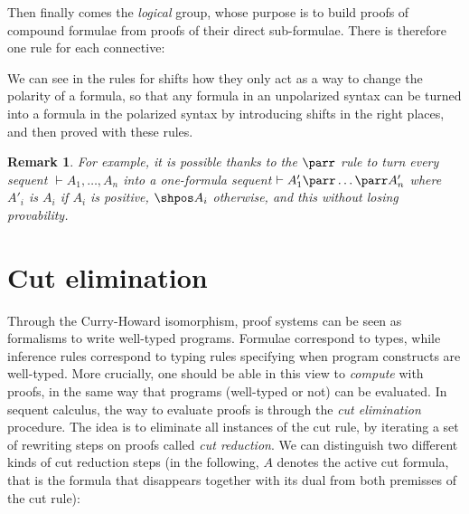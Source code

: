 \documentclass[12pt]{report}
\newcommand{\seq}{\vdash}
\newcommand{\irule}[1]{\vspace*{-10em}\footnotesize$#1$}
\newtheorem{remark}{Remark}
\begin{document}
Then finally comes the \emph{logical} group, whose purpose is to build proofs of compound formulae
from proofs of their direct sub-formulae. There is therefore one rule for each connective:


We can see in the rules for shifts how they only act as a way to change the polarity of a formula,
so that any formula in an unpolarized syntax can be turned into a formula in the polarized syntax by
introducing shifts in the right places, and then proved with these rules.

\begin{remark}\label{rem:parr-shifts}
For example, it is possible thanks to the $\parr$ rule to turn every sequent $\seq A_1, \ldots, A_n$
into a one-formula sequent $\seq A'_1 \parr \ldots \parr A'_n$ where $A'_i$ is $A_i$ if $A_i$ is
positive, $\shpos A_i$ otherwise, and this without losing provability.
\end{remark}

\section{Cut elimination}

Through the Curry-Howard isomorphism, proof systems can be seen as formalisms to write well-typed
programs. Formulae correspond to types, while inference rules correspond to typing rules specifying
when program constructs are well-typed. More crucially, one should be able in this view to
\emph{compute} with proofs, in the same way that programs (well-typed or not) can be evaluated. In
sequent calculus, the way to evaluate proofs is through the \emph{cut elimination} procedure. The
idea is to eliminate all instances of the cut rule, by iterating a set of rewriting steps on proofs
called \emph{cut reduction}. We can distinguish two different kinds of cut reduction steps (in the
following, $A$ denotes the active cut formula, that is the formula that disappears together with its
dual from both premisses of the cut rule):
\end{document}
